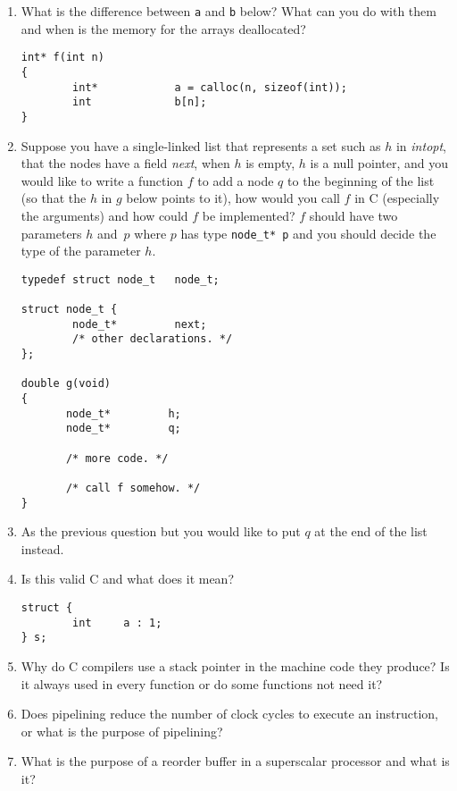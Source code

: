 \documentclass{article}
\begin{document}
\begin{enumerate}
\item What is the difference between \verb.a. and \verb.b. below? What can you do with them and when is the memory for the arrays deallocated?

\begin{verbatim}
int* f(int n)
{
        int*            a = calloc(n, sizeof(int));
        int             b[n];
}
\end{verbatim}

\item Suppose you have a single-linked list that represents a set such as $h$ in {\em intopt}, that the nodes have a field {\em next}, when $h$ is empty, $h$ is a null pointer, and you would like to write a function $f$ to add a node $q$ to the beginning of the list (so that the $h$ in $g$ below points to it), how would you call $f$ in C (especially the arguments) and how could $f$ be implemented? $f$ should have two parameters $h$ and~$p$ where $p$ has type \verb.node_t* p. and you should decide the type of the parameter $h$.


\begin{verbatim}
typedef struct node_t   node_t;

struct node_t {
        node_t*         next;
        /* other declarations. */
};

double g(void)
{
       node_t*         h;
       node_t*         q;

       /* more code. */

       /* call f somehow. */
}
\end{verbatim}

\item As the previous question but you would like to put $q$ at the end of the list instead.

\item Is this valid C and what does it mean?
\begin{verbatim}
struct {
        int     a : 1;
} s;
\end{verbatim}
\item Why do C compilers use a stack pointer in the machine code they produce? Is it always used in every function
or do some functions not need it?
\item Does pipelining reduce the number of clock cycles to execute
an instruction, or what is the purpose of pipelining?

\item What is the purpose of a reorder buffer in a superscalar processor and what is it?


\end{enumerate}
\end{document}

